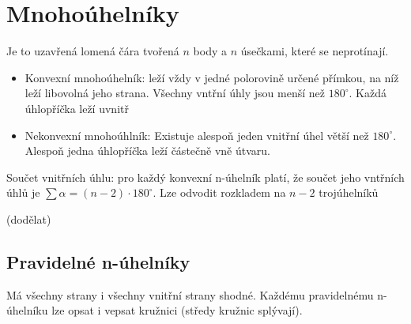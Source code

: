 \documentclass[12pt]{article}
\begin{document}

\section*{Mnohoúhelníky}
Je to uzavřená lomená čára tvořená $n$ body a $n$ úsečkami, které se neprotínají.
\begin{itemize}
    \item Konvexní mnohoúhelník: leží vždy v jedné polorovině určené přímkou, na níž leží libovolná jeho strana. Všechny vntřní úhly jsou menší než $180^\circ$. Každá úhlopříčka leží uvnitř
    \item Nekonvexní mnohoúhlník: Existuje alespoň jeden vnitřní úhel větší než $180^\circ$. Alespoň jedna úhlopříčka leží částečně vně útvaru.
\end{itemize}
Součet vnitřních úhlu: pro každý konvexní n-úhelník platí, že součet jeho vntřních úhlů je $\sum\alpha = (n-2)\cdot 180^\circ$. Lze odvodit rozkladem na $n-2$ trojúhelníků

(dodělat)
\subsection*{Pravidelné n-úhelníky}
Má všechny strany i všechny vnitřní strany shodné. Každému pravidelnému n-úhelníku lze opsat i vepsat kružnici (středy kružnic splývají).
\end{document}
